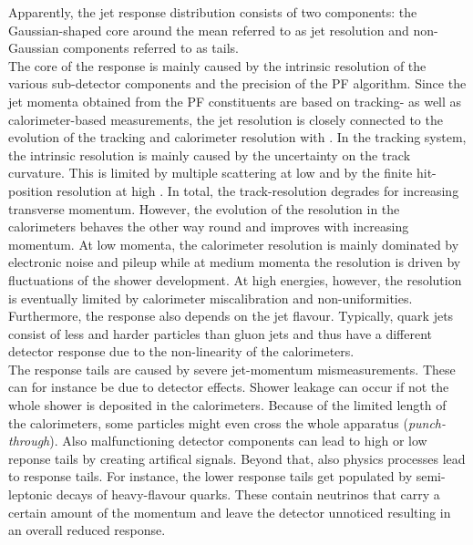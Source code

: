 Apparently, the jet response distribution consists of two components: the Gaussian-shaped core around the mean referred to as jet resolution and non-Gaussian components referred to as tails. \\
The core of the response is mainly caused by the intrinsic resolution of the various sub-detector components and the precision of the PF algorithm. Since the jet momenta obtained from the PF constituents are based on tracking- as well as calorimeter-based measurements, the jet resolution is closely connected to the evolution of the tracking and calorimeter resolution with \pt. In the tracking system, the intrinsic resolution is mainly caused by the uncertainty on the track curvature. This is limited by multiple scattering at low \pt and by the finite hit-position resolution at high \pt. In total, the track-\pt resolution degrades for increasing transverse momentum. However, the evolution of the resolution in the calorimeters behaves the other way round and improves with increasing momentum. At low momenta, the calorimeter resolution is mainly dominated by electronic noise and pileup while at medium momenta the resolution is driven by fluctuations of the shower development. At high energies, however, the resolution is eventually limited by calorimeter miscalibration and non-uniformities. Furthermore, the response also depends on the jet flavour. Typically, quark jets consist of less and harder particles than gluon jets and thus have a different detector response due to the non-linearity of the calorimeters.  \\
The response tails are caused by severe jet-momentum mismeasurements. These can for instance be due to detector effects. Shower leakage can occur if not the whole shower is deposited in the calorimeters. Because of the limited length of the calorimeters, some particles might even cross the whole apparatus (\textit{punch-through}). Also malfunctioning detector components can lead to high or low reponse tails by creating artifical signals. Beyond that, also physics processes lead to response tails. For instance, the lower response tails get populated by semi-leptonic decays of heavy-flavour quarks. These contain neutrinos that carry a certain amount of the momentum and leave the detector unnoticed resulting in an overall reduced response. 

